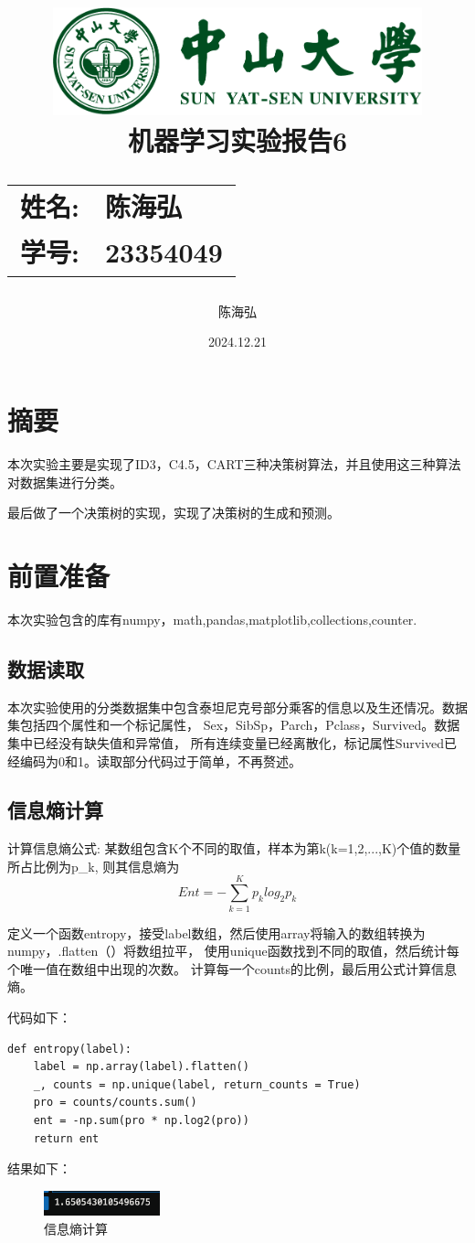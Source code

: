 \documentclass[12pt,a4paper,oneside]{article}
\date{\Large 2024.12.21}
\author{陈海弘}
\title{
    \vspace*{-2cm}
    \includegraphics[width=0.8\textwidth]{SYSULogo.pdf} \\[1em]
    \vfill
    \LARGE \textbf{机器学习实验报告6} \\[1em]
    \Large
    \begin{tabular}{rl}
        \textbf{姓名:} & \textbf{陈海弘} \\
        \textbf{学号:} & \textbf{23354049}
    \end{tabular}
    \vfill
}
\begin{document}
\maketitle
\newpage
\tableofcontents
\newpage
\section{摘要}
\qquad 本次实验主要是实现了ID3，C4.5，CART三种决策树算法，并且使用这三种算法对数据集进行分类。

最后做了一个决策树的实现，实现了决策树的生成和预测。
\section{前置准备}
本次实验包含的库有numpy，math,pandas,matplotlib,collections,counter.
\subsection{数据读取}
\qquad 本次实验使用的分类数据集中包含泰坦尼克号部分乘客的信息以及生还情况。数据集包括四个属性和一个标记属性，
Sex，SibSp，Parch，Pclass，Survived。数据集中已经没有缺失值和异常值，
所有连续变量已经离散化，标记属性Survived已经编码为0和1。读取部分代码过于简单，不再赘述。

\subsection{信息熵计算}
\qquad 计算信息熵公式:
某数组包含K个不同的取值，样本为第k(k=1,2,...,K)个值的数量所占比例为p\_k, 则其信息熵为$$Ent=-\sum_{k=1}^K p_k log_2 p_k$$

定义一个函数entropy，接受label数组，然后使用array将输入的数组转换为numpy，.flatten（）将数组拉平，
使用unique函数找到不同的取值，然后统计每个唯一值在数组中出现的次数。
计算每一个counts的比例，最后用公式计算信息熵。

代码如下：
\begin{lstlisting}
def entropy(label):
    label = np.array(label).flatten()
    _, counts = np.unique(label, return_counts = True)
    pro = counts/counts.sum()
    ent = -np.sum(pro * np.log2(pro))
    return ent
\end{lstlisting}


结果如下：
\begin{figure}[H]
    \centering
    \includegraphics[width=0.3\textwidth]{image/1.png}
    \caption{信息熵计算}
\end{figure}
\end{document}
